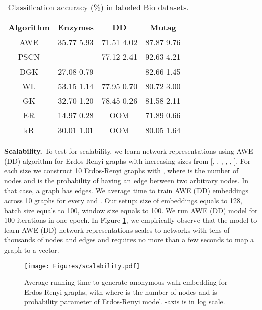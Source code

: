\documentclass{article}
\theoremstyle{definition}
\begin{document}
\begin{table}[h]
\caption{Classification accuracy (\%) in labeled Bio datasets.}\label{labeled_results}
\vskip 0.15in
\begin{center}
\begin{small}
\centering
\begin{tabular}{| c | c | c | c | c |}
\hline
Algorithm & Enzymes & DD & Mutag  \\ \hline \hline 
 AWE & 35.77  5.93 & 71.51  4.02 & 87.87  9.76 \\ \hline
 PSCN &  & 77.12  2.41 & 92.63  4.21 \\ \hline  
 DGK & 27.08  0.79 &  & 82.66  1.45 \\ \hline
 WL & 53.15  1.14 & 77.95  0.70 & 80.72  3.00 \\ \hline
 GK & 32.70  1.20 & 78.45  0.26 & 81.58  2.11 \\ \hline
 ER & 14.97  0.28 & OOM & 71.89  0.66 \\ \hline
 kR & 30.01  1.01 & OOM & 80.05  1.64 \\ \hline
\end{tabular}
\end{small}
\end{center}
\vskip -0.1in
\end{table}\textbf{}

\textbf{Scalability. }
To test for scalability, we learn network representations using AWE (DD) algorithm for Erdos-Renyi graphs with increasing sizes from [, , , , , ]. For each size we construct 10 Erdos-Renyi graphs with , where  is the number of nodes and  is the probability of having an edge between two arbitrary nodes. In that case, a graph has  edges. We average time to train AWE (DD) embeddings across 10 graphs for every  and . Our setup: size of embeddings equals to 128, batch size equals to 100, window size equals to 100. We run AWE (DD) model for 100 iterations in one epoch. 
In Figure \ref{scalability}, we empirically observe that the model to learn AWE (DD) network representations scales to networks with tens of thousands of nodes and edges and requires no more than a few seconds to map a graph to a vector. 

\begin{figure}[h]
\centering
    \texttt{[image: Figures/scalability.pdf]}
\caption{Average running time to generate anonymous walk embedding for Erdos-Renyi graphs, with  where  is the number of nodes and  is probability parameter of Erdos-Renyi model. -axis is in log scale.}\label{scalability}
\end{figure}
\end{document}
